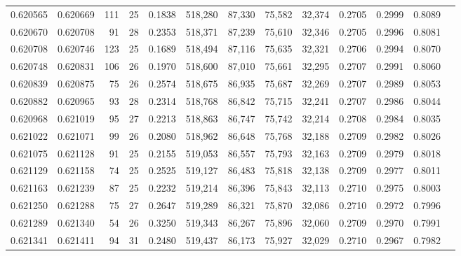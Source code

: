 \begin{tabular}{rrrrrrrrrrrrr}
0.620565 & 0.620669 & 111 &  25 &                                     0.1838 & 518,280 &  87,330 &  75,582 &  32,374 & 0.2705 & 0.2999 & 0.8089 \\
0.620670 & 0.620708 &  91 &  28 &                                     0.2353 & 518,371 &  87,239 &  75,610 &  32,346 & 0.2705 & 0.2996 & 0.8081 \\
0.620708 & 0.620746 & 123 &  25 &                                     0.1689 & 518,494 &  87,116 &  75,635 &  32,321 & 0.2706 & 0.2994 & 0.8070 \\
0.620748 & 0.620831 & 106 &  26 &                                     0.1970 & 518,600 &  87,010 &  75,661 &  32,295 & 0.2707 & 0.2991 & 0.8060 \\
0.620839 & 0.620875 &  75 &  26 &                                     0.2574 & 518,675 &  86,935 &  75,687 &  32,269 & 0.2707 & 0.2989 & 0.8053 \\
0.620882 & 0.620965 &  93 &  28 &                                     0.2314 & 518,768 &  86,842 &  75,715 &  32,241 & 0.2707 & 0.2986 & 0.8044 \\
0.620968 & 0.621019 &  95 &  27 &                                     0.2213 & 518,863 &  86,747 &  75,742 &  32,214 & 0.2708 & 0.2984 & 0.8035 \\
0.621022 & 0.621071 &  99 &  26 &                                     0.2080 & 518,962 &  86,648 &  75,768 &  32,188 & 0.2709 & 0.2982 & 0.8026 \\
0.621075 & 0.621128 &  91 &  25 &                                     0.2155 & 519,053 &  86,557 &  75,793 &  32,163 & 0.2709 & 0.2979 & 0.8018 \\
0.621129 & 0.621158 &  74 &  25 &                                     0.2525 & 519,127 &  86,483 &  75,818 &  32,138 & 0.2709 & 0.2977 & 0.8011 \\
0.621163 & 0.621239 &  87 &  25 &                                     0.2232 & 519,214 &  86,396 &  75,843 &  32,113 & 0.2710 & 0.2975 & 0.8003 \\
0.621250 & 0.621288 &  75 &  27 &                                     0.2647 & 519,289 &  86,321 &  75,870 &  32,086 & 0.2710 & 0.2972 & 0.7996 \\
0.621289 & 0.621340 &  54 &  26 &                                     0.3250 & 519,343 &  86,267 &  75,896 &  32,060 & 0.2709 & 0.2970 & 0.7991 \\
0.621341 & 0.621411 &  94 &  31 &                                     0.2480 & 519,437 &  86,173 &  75,927 &  32,029 & 0.2710 & 0.2967 & 0.7982 \\

\end{tabular}
